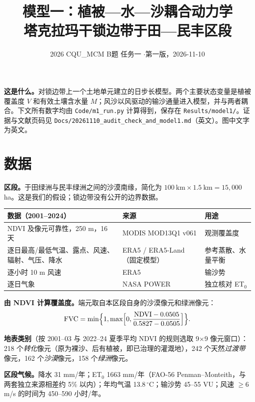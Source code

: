 \documentclass[11pt,a4paper]{ctexart}
\title{模型一：植被—水—沙耦合动力学\\[2pt]\large 塔克拉玛干锁边带于田—民丰区段}
\author{2026 CQU\_MCM B题 任务一 \quad$\cdot$\quad 第一版，2026-11-10}
\date{}
\begin{document}
\maketitle

\noindent\textbf{这是什么。}对锁边带上一个土地单元建立的日步长模型。两个主要状态变量是植被覆盖度 $V$ 和有效土壤含水量 $M$；风沙以风驱动的输沙通量进入模型，并与两者耦合。下文所有数字均由 \texttt{Code/m1\_run.py} 计算得到，保存在 \texttt{Results/model1/}。证据与文献页码见 \texttt{Docs/20261110\_audit\_check\_and\_model1.md}（英文）。图中文字为英文。

\section{数据}
\textbf{区段。}于田绿洲与民丰绿洲之间的沙漠南缘，简化为 $100\ \text{km}\times1.5\ \text{km}=15{,}000$ ha。这是我们的假设；锁边带没有公开的边界数据。

\begin{table}[H]\small
\begin{tabularx}{\linewidth}{@{}p{4.8cm}p{4.4cm}L@{}}
\toprule
数据（2001--2024） & 来源 & 用途\\
\midrule
NDVI 及像元可靠性，250 m，16 天 & MODIS MOD13Q1 v061 & 观测覆盖度\\
逐日最高/最低气温、露点、风速、辐射、气压、降水 & ERA5 / ERA5-Land（固定模型） & 参考蒸散、水量平衡\\
逐小时 10 m 风速 & ERA5 & 输沙势\\
逐日气象 & NASA POWER & 独立核对 ET$_0$\\
\bottomrule
\end{tabularx}
\end{table}

\textbf{由 NDVI 计算覆盖度。}端元取自本区段自身的沙漠像元和绿洲像元：
\begin{equation}
\mathrm{FVC}=\min\Bigl\{1,\max\Bigl[0,\frac{\mathrm{NDVI}-0.0505}{0.5827-0.0505}\Bigr]\Bigr\}.
\end{equation}

\textbf{地表类别}（按 2001--03 与 2022--24 夏季平均 NDVI 的规则选取 9$\times$9 像元窗口）：218 个\emph{转化}像元（原为裸沙、后有植被，即已治理的灌溉地），242 个天然\emph{过渡带}像元，162 个\emph{沙漠}像元，158 个\emph{绿洲}像元。

\textbf{区段气候。}降水 31 mm/年；ET$_0$ 1663 mm/年（FAO-56 Penman--Monteith，与两套独立来源相差约 5\% 以内）；年均气温 13.8\,$^\circ$C；输沙势 45--55 VU；风速 $\ge 6$ m/s 的时间为 450--590 小时/年。
\end{document}
